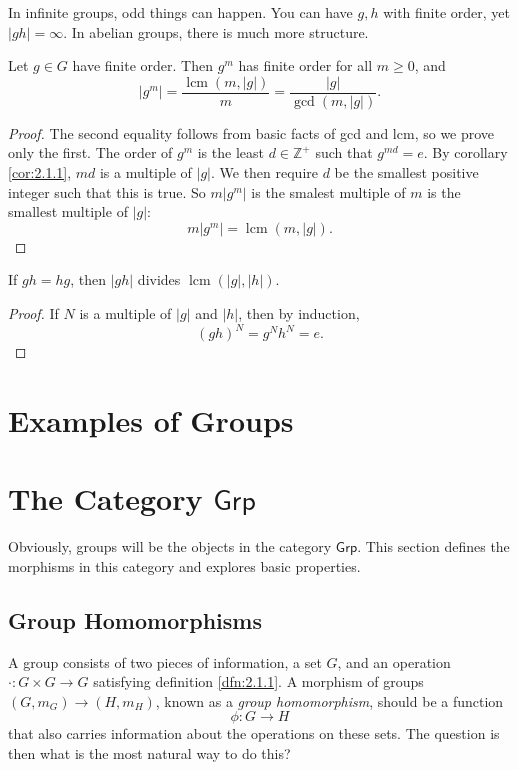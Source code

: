 In infinite groups, odd things can happen. You can have $g,h$ with finite order, yet $\left| gh \right| =\infty$. In abelian groups, there is much more structure.
\begin{proposition}\label{prp:2.1.4}
	Let $g\in G$ have finite order. Then $g^m$ has finite order for all $m\geq 0$, and
	\[
		\left| g^m \right| =\frac{\operatorname{lcm}(m,\left| g \right| ) }{m}=\frac{\left| g \right| }{\operatorname{gcd}(m,\left| g \right| ) }
	.\]
\end{proposition}
\begin{proof}
	The second equality follows from basic facts of gcd and lcm, so we prove only the first. The order of $g^m$ is the least $d\in\mathbb{Z}^+$ such that $g^{md}=e$. By corollary \ref{cor:2.1.1}, $md$ is a multiple of $\left| g \right| $. We then require $d$ be the smallest positive integer such that this is true. So $m\left| g^m \right| $ is the smalest multiple of $m$ is the smallest multiple of $\left| g \right| $:
	\[
		m\left| g^m \right| =\operatorname{lcm}(m,\left| g \right| ) 
	.\]
\end{proof}
\begin{proposition}\label{prp:2.1.5}
	If $gh=hg$, then $\left| gh \right| $ divides $\operatorname{lcm}(\left| g \right| ,\left| h \right| ) $.
\end{proposition}
\begin{proof}
	If $N$ is a multiple of $\left| g \right| $ and $\left| h \right| $, then by induction,
	\[
		(gh)^N=g^Nh^N=e
	.\]
\end{proof}

\section{Examples of Groups}
\section{The Category $\mathsf{Grp}$}
Obviously, groups will be the objects in the category $\mathsf{Grp}$. This section defines the morphisms in this category and explores basic properties.
\subsection{Group Homomorphisms}
A group consists of two pieces of information, a set $G$, and an operation $\cdot : G\times G \to G$ satisfying definition \ref{dfn:2.1.1}. A morphism of groups $(G,m_G)\to (H,m_H)$, known as a \emph{group homomorphism}, should be a function
\[
	\phi : G \to H
\]
that also carries information about the operations on these sets. The question is then what is the most natural way to do this?

